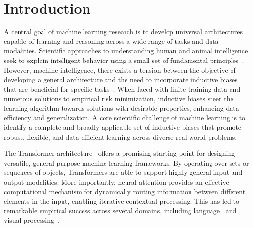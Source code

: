 \section{Introduction}\label{sec:intro}

A central goal of machine learning research is to develop universal architectures capable of learning and reasoning across a wide range of tasks and data modalities. Scientific approaches to understanding human and animal intelligence seek to explain intelligent behavior using a small set of fundamental principles~\citep{marcus2003algebraic}. However, machine intelligence, there exists a tension between the objective of developing a general architecture and the need to incorporate inductive biases that are beneficial for specific tasks~\citep{wolpert1995no,baxter2000model}. When faced with finite training data and numerous solutions to empirical risk minimization, inductive biases steer the learning algorithm towards solutions with desirable properties, enhancing data efficiency and generalization.
A core scientific challenge of machine learning is to identify a complete and broadly applicable set of inductive biases that promote robust, flexible, and data-efficient learning across diverse real-world problems.


The Transformer architecture~\citep{vaswani2017attention} offers a promising starting point for designing versatile, general-purpose machine learning frameworks. By operating over sets or sequences of objects, Transformers are able to support highly-general input and output modalities. More importantly, neural attention provides an effective computational mechanism for dynamically routing information between different elements in the input, enabling iterative contextual processing. This has led to remarkable empirical success across several domains, including language~\citep{radfordImprovingLanguageUnderstanding2018,devlinBERTPretrainingDeep2019,radford2019language,kaplan2020scalinglawsneurallanguage,brown2020languagemodelsfewshotlearners} and visual processing~\citep{dosovitskiyImageWorth16x162020,carion2020end,zhai2022scaling}.

